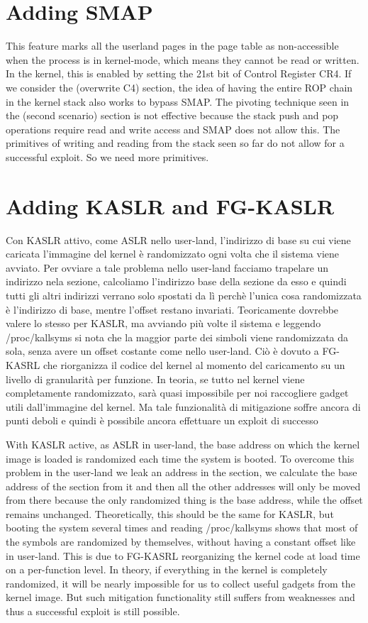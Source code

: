 \documentclass{masterthesis}
\begin{document}
\section{Adding SMAP}
This feature marks all the userland pages in the page table as non-accessible when the process is in kernel-mode, which means they cannot be read or written.
In the kernel, this is enabled by setting the 21st bit of Control Register CR4.
If we consider the (overwrite C4) section, the idea of having the entire ROP chain in the kernel stack also works to bypass SMAP.
The pivoting technique seen in the (second scenario) section is not effective because the stack push and pop operations require read and write access and SMAP does not allow this. The primitives of writing and reading from the stack seen so far do not allow for a successful exploit. So we need more primitives.
\section{Adding KASLR and FG-KASLR}
Con KASLR attivo, come ASLR nello user-land, l'indirizzo di base su cui viene caricata l'immagine del kernel è randomizzato ogni volta che il sistema viene avviato.
Per ovviare a tale problema nello user-land facciamo trapelare un indirizzo nela sezione, calcoliamo l'indirizzo base della sezione da esso e quindi tutti gli altri indirizzi verrano solo spostati da lì perchè l'unica cosa randomizzata è l'indirizzo di base, mentre l'offset restano invariati.
Teoricamente dovrebbe valere lo stesso per KASLR, ma avviando più volte il sistema e leggendo /proc/kallsyms si nota che la maggior parte dei simboli viene randomizzata da sola, senza avere un offset costante come nello user-land.
Ciò è dovuto a FG-KASRL che riorganizza il codice del kernel al momento del caricamento su un livello di granularità per funzione.
In teoria, se tutto nel kernel viene completamente randomizzato, sarà quasi impossibile per noi raccogliere gadget utili dall'immagine del kernel. Ma tale funzionalità di mitigazione soffre ancora di punti deboli e quindi è possibile ancora effettuare un exploit di successo

With KASLR active, as ASLR in user-land, the base address on which the kernel image is loaded is randomized each time the system is booted.
To overcome this problem in the user-land we leak an address in the section, we calculate the base address of the section from it and then all the other addresses will only be moved from there because the only randomized thing is the base address, while the offset remains unchanged.
Theoretically, this should be the same for KASLR, but booting the system several times and reading /proc/kallsyms shows that most of the symbols are randomized by themselves, without having a constant offset like in user-land.
This is due to FG-KASRL reorganizing the kernel code at load time on a per-function level.
In theory, if everything in the kernel is completely randomized, it will be nearly impossible for us to collect useful gadgets from the kernel image. But such mitigation functionality still suffers from weaknesses and thus a successful exploit is still possible.
\end{document}
